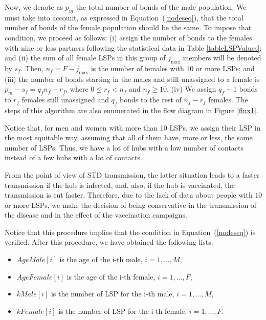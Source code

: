 Now, we denote as $p_m$ the total number of bonds of the male population. We must take into account, as expressed in Equation\
(\ref{nodeseq}), that the total number of bonds of the female population should be the same. To impose that condition, we
proceed as follows: (i) assign the number of bonds to the females with nine or less partners following the statistical 
data in Table \ref{tableLSPValues}; and (ii) the sum of all female LSPs in this group of $j_{\mbox{max}}$ members will be denoted by $s_f$. 
Then, $n_f=F-j_{\mbox{max}}$ is the number of females with $10$ or more LSPs; and (iii) the number of bonds starting in the males and still unassigned to a female is $p_m-s_f= q_f n_f + r_f$, where $0 \le r_f < n_f$ and $n_f \ge 10$. (iv) We assign $q_f+1$ bonds to $r_f$ females still unassigned and $q_f$ bonds to the rest of $n_f-r_f$ females. The steps of this algorithm are also enumerated in the flow diagram in Figure  \ref{flux1}.

Notice that, for men and women with more than 10 LSPs, we assign their LSP in the most equitable way, assuming that all of them have, more or less, the same number of LSPs. Thus, we have a lot of hubs with a low number of contacts instead of a few hubs with a lot of contacts.

From the point of view of STD transmission, the latter situation leads to a faster transmission if the hub is infected, and, also, if the hub is vaccinated, the transmission is cut faster. Therefore, due to the lack of data about people with $10$ or more LSPs, we make the decision of being conservative in the transmission of the disease and in the effect of the vaccination campaigns.

Notice that this procedure implies that the condition in Equation\ (\ref{nodeseq}) is verified. After this procedure, we have obtained the following lists:
\begin{itemize}[leftmargin=*,labelsep=5mm]
\item $AgeMale\left[ i \right]$ is the age of the i-th male, $i=1,\ldots,M$,
\item $AgeFemale\left[ i\right]$ is the age of the i-th female, $i=1,\ldots,F$,
\item $kMale\left[ i \right]$ is the number of LSP for the i-th male, $i=1,\ldots,M$,
\item $kFemale\left[ i \right]$ is the number of LSP for the i-th female, $i=1,\ldots,F$.
\end{itemize}

